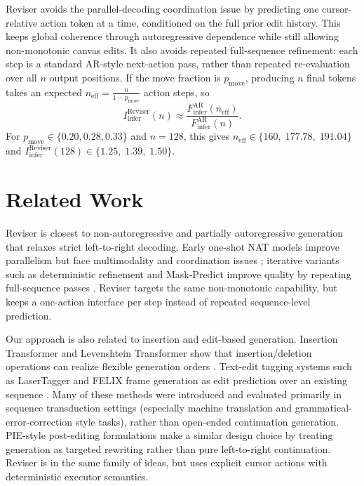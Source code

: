 \documentclass[11pt]{article}
\begin{document}
Reviser avoids the parallel-decoding coordination issue by predicting one cursor-relative action token at a time, conditioned on the full prior edit history. This keeps global coherence through autoregressive dependence while still allowing non-monotonic canvas edits. It also avoids repeated full-sequence refinement: each step is a standard AR-style next-action pass, rather than repeated re-evaluation over all $n$ output positions. If the move fraction is $p_{\text{move}}$, producing $n$ final tokens takes an expected $n_{\text{eff}}=\frac{n}{1-p_{\text{move}}}$ action steps, so
\[
I_{\text{infer}}^{\text{Reviser}}(n)\approx\frac{F_{\text{infer}}^{\text{AR}}(n_{\text{eff}})}{F_{\text{infer}}^{\text{AR}}(n)}.
\]
For $p_{\text{move}}\in\{0.20,0.28,0.33\}$ and $n=128$, this gives
$n_{\text{eff}}\in\{160,\;177.78,\;191.04\}$ and
$I_{\text{infer}}^{\text{Reviser}}(128)\in\{\num{1.25},\;\num{1.39},\;\num{1.50}\}$.

\section{Related Work}
\label{sec:related}

Reviser is closest to non-autoregressive and partially autoregressive generation that relaxes strict left-to-right decoding. Early one-shot NAT models improve parallelism but face multimodality and coordination issues \citep{gu2018nonautoregressive}; iterative variants such as deterministic refinement and Mask-Predict improve quality by repeating full-sequence passes \citep{lee2018deterministic,ghazvininejad2019maskpredict}. Reviser targets the same non-monotonic capability, but keeps a one-action interface per step instead of repeated sequence-level prediction.

Our approach is also related to insertion and edit-based generation. Insertion Transformer and Levenshtein Transformer show that insertion/deletion operations can realize flexible generation orders \citep{stern2019insertion,gu2019levenshtein}. Text-edit tagging systems such as LaserTagger and FELIX frame generation as edit prediction over an existing sequence \citep{malmi2019lasertagger,mallinson2020felix}. Many of these methods were introduced and evaluated primarily in sequence transduction settings (especially machine translation and grammatical-error-correction style tasks), rather than open-ended continuation generation. PIE-style post-editing formulations make a similar design choice by treating generation as targeted rewriting rather than pure left-to-right continuation. Reviser is in the same family of ideas, but uses explicit cursor actions with deterministic executor semantics.
\end{document}
